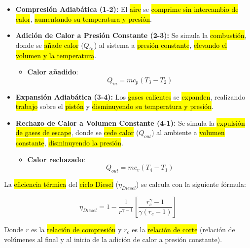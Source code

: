 \documentclass{article}
\begin{document}
\begin{itemize}
    \item \textbf{Compresión Adiabática (1-2):} El \hl{aire} se \hl{comprime sin intercambio de calor}, \hl{aumentando su temperatura y presión}.

    \item \textbf{Adición de Calor a Presión Constante (2-3):} Se simula la \hl{combustión}, donde se \hl{añade calor} ($Q_{in}$) al sistema a \hl{presión constante}, \hl{elevando el volumen y la temperatura}.
    \begin{itemize}
        \item \textbf{Calor añadido}:
        $$
        	Q_{in} = m c_p (T_3 - T_2)
        $$
    \end{itemize}

    \item \textbf{Expansión Adiabática (3-4):} Los \hl{gases calientes} se \hl{expanden}, realizando \hl{trabajo} sobre el \hl{pistón} y \hl{disminuyendo su temperatura y presión}.

    \item \textbf{Rechazo de Calor a Volumen Constante (4-1):} Se simula la \hl{expulsión de gases de escape}, donde se \hl{cede calor} ($Q_{out}$) al ambiente a \hl{volumen constante}, \hl{disminuyendo la presión}.
    \begin{itemize}
        \item \textbf{Calor rechazado}:
        $$
           Q_{out} = m c_v (T_4 - T_1)
       $$
    \end{itemize}
\end{itemize}

La \hl{eficiencia térmica} del \hl{ciclo Diesel} ($\eta_{Diesel}$) se calcula con la siguiente fórmula:

$$
\eta_{Diesel} = 1 - \frac{1}{r^{\gamma-1}} \left[ \frac{r_c^{\gamma} - 1}{\gamma (r_c - 1)} \right]
$$

Donde $r$ es la \hl{relación de compresión} y $r_c$ es la \hl{relación de corte} (relación de volúmenes al final y al inicio de la adición de calor a presión constante).
\end{document}
